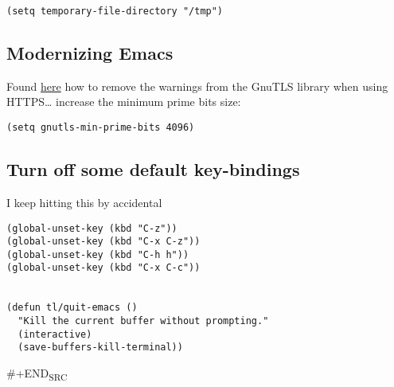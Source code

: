 \documentclass[12pt]{article}
\begin{document}
\begin{verbatim}
(setq temporary-file-directory "/tmp")
\end{verbatim}

\subsection{Modernizing Emacs}
\label{sec:org18932c3}

Found \href{https://github.com/wasamasa/dotemacs/blob/master/init.org\#init}{here} how to remove the warnings from the GnuTLS library when
using HTTPS\ldots{} increase the minimum prime bits size:
\begin{verbatim}
(setq gnutls-min-prime-bits 4096)
\end{verbatim}

\subsection{Turn off some default key-bindings}
\label{sec:org5766f7b}
I keep hitting this by accidental
\begin{verbatim}
(global-unset-key (kbd "C-z"))
(global-unset-key (kbd "C-x C-z"))
(global-unset-key (kbd "C-h h"))
(global-unset-key (kbd "C-x C-c"))


(defun tl/quit-emacs ()
  "Kill the current buffer without prompting."
  (interactive)
  (save-buffers-kill-terminal))

\end{verbatim}
\#+END\textsubscript{SRC}
\end{document}
